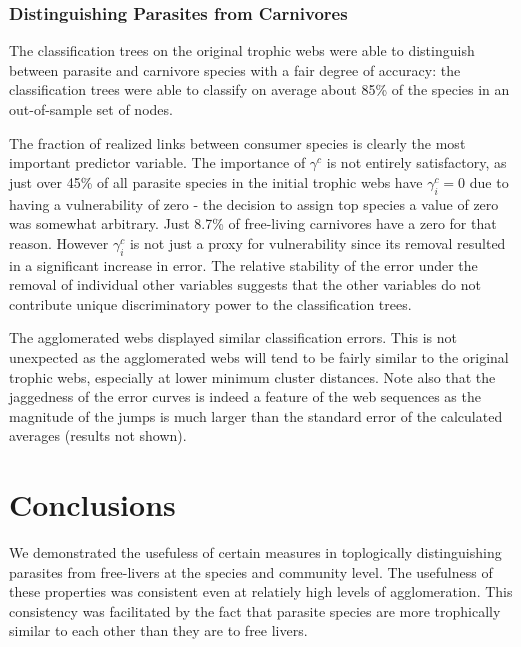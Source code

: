 \documentclass[../dissertation.tex]{subfiles}
\begin{document}
\subsubsection{Distinguishing Parasites from Carnivores} The classification
trees on the original trophic webs were able to distinguish between parasite
and carnivore species with a fair degree of accuracy: 
the classification trees were able to classify on average about 85\% of the species
in an out-of-sample set of nodes. 

The fraction of realized links between consumer species is clearly the most
important predictor variable. The importance of $\gamma^{c}$ is not entirely
satisfactory, as just over 45\% of all parasite species in the initial trophic
webs have $\gamma^{c}_i=0$ due to having a vulnerability of zero - the
decision to assign top species a value of zero was somewhat arbitrary. Just
8.7\% of free-living carnivores have a zero for that reason. However
$\gamma^{c}_i$ is not just a proxy for vulnerability since its removal
resulted in a significant increase in error. The relative stability of the
error under the removal of individual other variables suggests that the other
variables do not contribute unique discriminatory power to the classification
trees.

The agglomerated webs displayed similar classification errors.  This is not
unexpected as the agglomerated webs will tend to be fairly similar to the
original trophic webs, especially at lower minimum cluster distances.  Note
also that the jaggedness of the error curves is indeed a feature of the web
sequences as the magnitude of the jumps is much larger than the standard error
of the calculated averages (results not shown).

\section{Conclusions} We demonstrated the usefuless of certain measures in
toplogically distinguishing parasites from free-livers at the species and
community level. The usefulness of these properties was consistent even at
relatiely high levels of agglomeration. This consistency was facilitated by the
fact that parasite species are more trophically similar to each other than they
are to free livers.

{}

\end{document}
